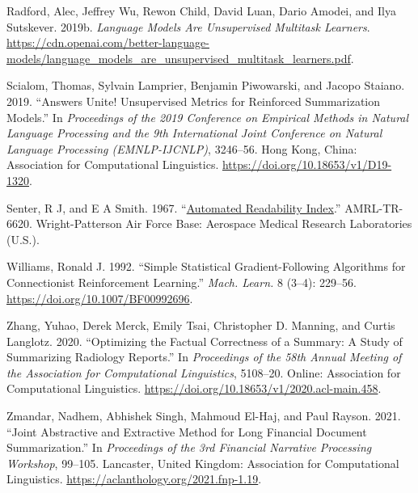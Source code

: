 \documentclass[
]{article}
\newlength{\cslhangindent}
\newlength{\cslentryspacingunit} %
\newenvironment{CSLReferences}[2] %
 {%
  \setlength{\parindent}{0pt}
  \ifodd #1
  \let\oldpar\par
  \def\par{\hangindent=\cslhangindent\oldpar}
  \fi
  \setlength{\parskip}{#2\cslentryspacingunit}
 }%
 {}
\begin{document}
\begin{CSLReferences}{1}{0}
\leavevmode{}%
Radford, Alec, Jeffrey Wu, Rewon Child, David Luan, Dario Amodei, and
Ilya Sutskever. 2019b. \emph{Language Models Are Unsupervised Multitask
Learners}.
\url{https://cdn.openai.com/better-language-models/language_models_are_unsupervised_multitask_learners.pdf}.

\leavevmode{}%
Scialom, Thomas, Sylvain Lamprier, Benjamin Piwowarski, and Jacopo
Staiano. 2019. {``Answers Unite! Unsupervised Metrics for Reinforced
Summarization Models.''} In \emph{Proceedings of the 2019 Conference on
Empirical Methods in Natural Language Processing and the 9th
International Joint Conference on Natural Language Processing
(EMNLP-IJCNLP)}, 3246--56. Hong Kong, China: Association for
Computational Linguistics. \url{https://doi.org/10.18653/v1/D19-1320}.

\leavevmode{}%
Senter, R J, and E A Smith. 1967.
{``\href{https://www.ncbi.nlm.nih.gov/pubmed/5302480}{Automated
Readability Index}.''} AMRL-TR-6620. Wright-Patterson Air Force Base:
Aerospace Medical Research Laboratories (U.S.).

\leavevmode{}%
Williams, Ronald J. 1992. {``Simple Statistical Gradient-Following
Algorithms for Connectionist Reinforcement Learning.''} \emph{Mach.
Learn.} 8 (3--4): 229--56. \url{https://doi.org/10.1007/BF00992696}.

\leavevmode{}%
Zhang, Yuhao, Derek Merck, Emily Tsai, Christopher D. Manning, and
Curtis Langlotz. 2020. {``Optimizing the Factual Correctness of a
Summary: A Study of Summarizing Radiology Reports.''} In
\emph{Proceedings of the 58th Annual Meeting of the Association for
Computational Linguistics}, 5108--20. Online: Association for
Computational Linguistics.
\url{https://doi.org/10.18653/v1/2020.acl-main.458}.

\leavevmode{}%
Zmandar, Nadhem, Abhishek Singh, Mahmoud El-Haj, and Paul Rayson. 2021.
{``Joint Abstractive and Extractive Method for Long Financial Document
Summarization.''} In \emph{Proceedings of the 3rd Financial Narrative
Processing Workshop}, 99--105. Lancaster, United Kingdom: Association
for Computational Linguistics.
\url{https://aclanthology.org/2021.fnp-1.19}.

\end{CSLReferences}
\end{document}
